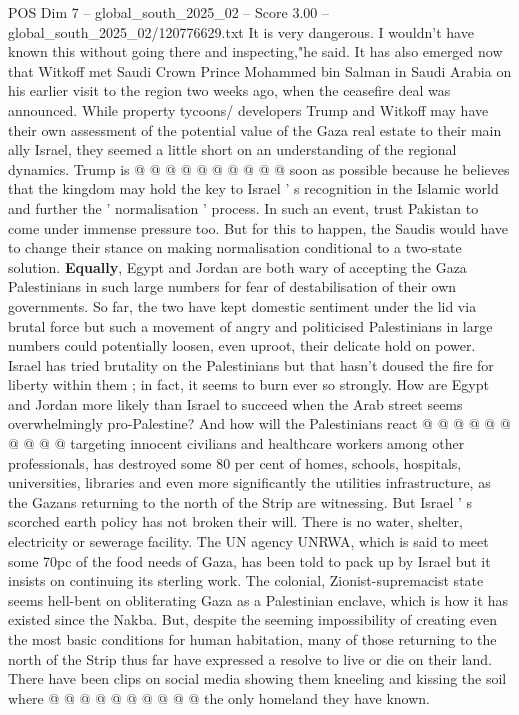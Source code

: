 \begin{textsample}{POS Dim 7 – global\_south\_2025\_02 – Score 3.00 – global\_south\_2025\_02/120776629.txt}
It is very dangerous.
I wouldn't have known this without going there and inspecting,"he said.
It has also emerged now that Witkoff met Saudi Crown Prince Mohammed bin Salman in Saudi Arabia on his earlier visit to the region two weeks ago, when the ceasefire deal was announced.
While property tycoons/ developers Trump and Witkoff may have their own assessment of the potential value of the Gaza real estate to their main ally Israel, they seemed a little short on an understanding of the regional dynamics.
Trump is @ @ @ @ @ @ @ @ @ @ soon as possible because he believes that the kingdom may hold the key to Israel ' s recognition in the Islamic world and further the ' normalisation ' process.
In such an event, trust Pakistan to come under immense pressure too.
But for this to happen, the Saudis would have to change their stance on making normalisation conditional to a two-state solution. \textbf{Equally}, Egypt and Jordan are both wary of accepting the Gaza Palestinians in such large numbers for fear of destabilisation of their own governments.
So far, the two have kept domestic sentiment under the lid via brutal force but such a movement of angry and politicised Palestinians in large numbers could potentially loosen, even uproot, their delicate hold on power.
Israel has tried brutality on the Palestinians but that hasn't doused the fire for liberty within them ; in fact, it seems to burn ever so strongly.
How are Egypt and Jordan more likely than Israel to succeed when the Arab street seems overwhelmingly pro-Palestine?
And how will the Palestinians react @ @ @ @ @ @ @ @ @ @ targeting innocent civilians and healthcare workers among other professionals, has destroyed some 80 per cent of homes, schools, hospitals, universities, libraries and even more significantly the utilities infrastructure, as the Gazans returning to the north of the Strip are witnessing.
But Israel ' s scorched earth policy has not broken their will.
There is no water, shelter, electricity or sewerage facility.
The UN agency UNRWA, which is said to meet some 70pc of the food needs of Gaza, has been told to pack up by Israel but it insists on continuing its sterling work.
The colonial, Zionist-supremacist state seems hell-bent on obliterating Gaza as a Palestinian enclave, which is how it has existed since the Nakba.
But, despite the seeming impossibility of creating even the most basic conditions for human habitation, many of those returning to the north of the Strip thus far have expressed a resolve to live or die on their land.
There have been clips on social media showing them kneeling and kissing the soil where @ @ @ @ @ @ @ @ @ @ the only homeland they have known.

\end{textsample}
